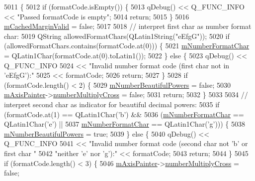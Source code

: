 \begin{DoxyCode}
5011                                                        \{
5012   \textcolor{keywordflow}{if} (formatCode.isEmpty()) \{
5013     qDebug() << Q\_FUNC\_INFO << \textcolor{stringliteral}{"Passed formatCode is empty"};
5014     \textcolor{keywordflow}{return};
5015   \}
5016   \hyperlink{class_q_c_p_axis_a2cde37b6e385f47e11322df4ac1b0e9b}{mCachedMarginValid} = \textcolor{keyword}{false};
5017 
5018   \textcolor{comment}{// interpret first char as number format char:}
5019   QString allowedFormatChars(QLatin1String(\textcolor{stringliteral}{"eEfgG"}));
5020   \textcolor{keywordflow}{if} (allowedFormatChars.contains(formatCode.at(0))) \{
5021     \hyperlink{class_q_c_p_axis_a39594313deef458f425bba25cd337a8a}{mNumberFormatChar} = QLatin1Char(formatCode.at(0).toLatin1());
5022   \} \textcolor{keywordflow}{else} \{
5023     qDebug() << Q\_FUNC\_INFO
5024              << \textcolor{stringliteral}{"Invalid number format code (first char not in 'eEfgG'):"}
5025              << formatCode;
5026     \textcolor{keywordflow}{return};
5027   \}
5028   \textcolor{keywordflow}{if} (formatCode.length() < 2) \{
5029     \hyperlink{class_q_c_p_axis_af03809bee3f3e35fcc38d25b6dd5003b}{mNumberBeautifulPowers} = \textcolor{keyword}{false};
5030     \hyperlink{class_q_c_p_axis_aeeae00935bd2dab82d64f32544a90913}{mAxisPainter}->\hyperlink{class_q_c_p_axis_painter_private_a0deb7524009140f00a774dfd286d002c}{numberMultiplyCross} = \textcolor{keyword}{false};
5031     \textcolor{keywordflow}{return};
5032   \}
5033 
5034   \textcolor{comment}{// interpret second char as indicator for beautiful decimal powers:}
5035   \textcolor{keywordflow}{if} (formatCode.at(1) == QLatin1Char(\textcolor{charliteral}{'b'}) &&
5036       (\hyperlink{class_q_c_p_axis_a39594313deef458f425bba25cd337a8a}{mNumberFormatChar} == QLatin1Char(\textcolor{charliteral}{'e'}) ||
5037        \hyperlink{class_q_c_p_axis_a39594313deef458f425bba25cd337a8a}{mNumberFormatChar} == QLatin1Char(\textcolor{charliteral}{'g'}))) \{
5038     \hyperlink{class_q_c_p_axis_af03809bee3f3e35fcc38d25b6dd5003b}{mNumberBeautifulPowers} = \textcolor{keyword}{true};
5039   \} \textcolor{keywordflow}{else} \{
5040     qDebug() << Q\_FUNC\_INFO
5041              << \textcolor{stringliteral}{"Invalid number format code (second char not 'b' or first char "}
5042                 \textcolor{stringliteral}{"neither 'e' nor 'g'):"} << formatCode;
5043     \textcolor{keywordflow}{return};
5044   \}
5045   \textcolor{keywordflow}{if} (formatCode.length() < 3) \{
5046     \hyperlink{class_q_c_p_axis_aeeae00935bd2dab82d64f32544a90913}{mAxisPainter}->\hyperlink{class_q_c_p_axis_painter_private_a0deb7524009140f00a774dfd286d002c}{numberMultiplyCross} = \textcolor{keyword}{false};

\end{DoxyCode}
